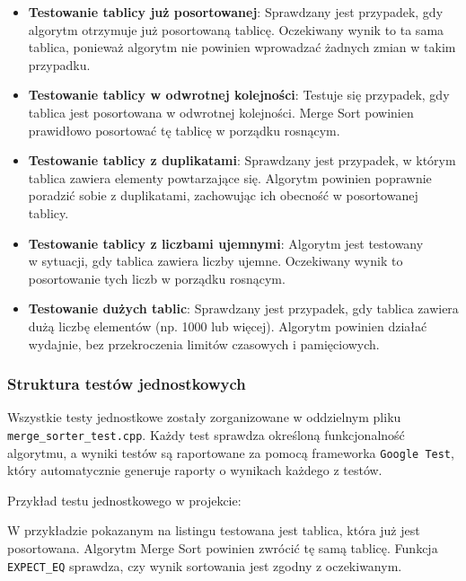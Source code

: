 \begin{itemize}
  \item \textbf{Testowanie tablicy już posortowanej}: Sprawdzany jest przypadek, gdy algorytm otrzymuje już posortowaną tablicę. Oczekiwany wynik to ta sama tablica, ponieważ algorytm nie powinien wprowadzać żadnych zmian w takim przypadku.
  \item \textbf{Testowanie tablicy w odwrotnej kolejności}: Testuje się przypadek, gdy tablica jest posortowana w odwrotnej kolejności. Merge Sort powinien prawidłowo posortować tę tablicę w porządku rosnącym.
  \item \textbf{Testowanie tablicy z duplikatami}: Sprawdzany jest przypadek, w którym tablica zawiera elementy powtarzające się. Algorytm powinien poprawnie poradzić sobie z duplikatami, zachowując ich obecność w posortowanej tablicy.
  \item \textbf{Testowanie tablicy z liczbami ujemnymi}: Algorytm jest testowany \\ w sytuacji, gdy tablica zawiera liczby ujemne. Oczekiwany wynik to posortowanie tych liczb w porządku rosnącym.
  \item \textbf{Testowanie dużych tablic}: Sprawdzany jest przypadek, gdy tablica zawiera dużą liczbę elementów (np. 1000 lub więcej). Algorytm powinien działać wydajnie, bez przekroczenia limitów czasowych i pamięciowych.
\end{itemize}

\newpage

\subsubsection{Struktura testów jednostkowych}

Wszystkie testy jednostkowe zostały zorganizowane w oddzielnym pliku \texttt{merge\_sorter\_test.cpp}. Każdy test sprawdza określoną funkcjonalność algorytmu, a wyniki testów są raportowane za pomocą frameworka \texttt{Google Test}, który automatycznie generuje raporty o wynikach każdego z testów.

Przykład testu jednostkowego w projekcie:



W przykładzie pokazanym na listingu  testowana jest tablica, która już jest posortowana. Algorytm Merge Sort powinien zwrócić tę samą tablicę. Funkcja \texttt{EXPECT\_EQ} sprawdza, czy wynik sortowania jest zgodny z oczekiwanym.

